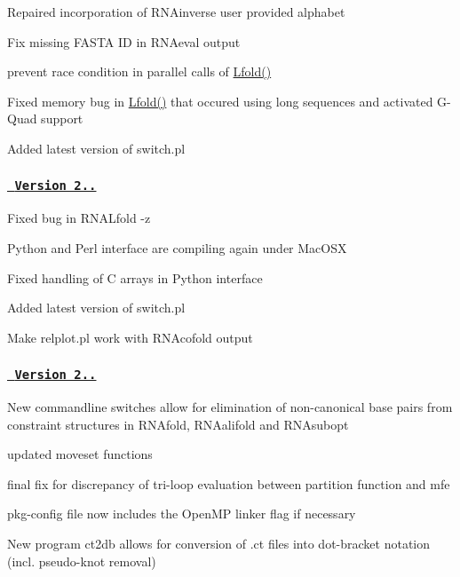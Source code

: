 \begin{DoxyItemize}
\item Repaired incorporation of R\+N\+Ainverse user provided alphabet
\item Fix missing F\+A\+S\+TA ID in R\+N\+Aeval output
\item prevent race condition in parallel calls of \mbox{\hyperlink{group__mfe__window__deprecated_gafdd1e11b5c7ad443b9f86b818e67bab4}{Lfold()}}
\item Fixed memory bug in \mbox{\hyperlink{group__mfe__window__deprecated_gafdd1e11b5c7ad443b9f86b818e67bab4}{Lfold()}} that occured using long sequences and activated G-\/\+Quad support
\item Added latest version of switch.\+pl
\end{DoxyItemize}

\subsubsection*{\href{https://github.com/ViennaRNA/ViennaRNA/compare/v2.1.6...v2.1.7}{\texttt{ Version 2..}}}


\begin{DoxyItemize}
\item Fixed bug in R\+N\+A\+Lfold -\/z
\item Python and Perl interface are compiling again under Mac\+O\+SX
\item Fixed handling of C arrays in Python interface
\item Added latest version of switch.\+pl
\item Make relplot.\+pl work with R\+N\+Acofold output
\end{DoxyItemize}

\subsubsection*{\href{https://github.com/ViennaRNA/ViennaRNA/compare/v2.1.5...v2.1.6}{\texttt{ Version 2..}}}


\begin{DoxyItemize}
\item New commandline switches allow for elimination of non-\/canonical base pairs from constraint structures in R\+N\+Afold, R\+N\+Aalifold and R\+N\+Asubopt
\item updated moveset functions
\item final fix for discrepancy of tri-\/loop evaluation between partition function and mfe
\item pkg-\/config file now includes the Open\+MP linker flag if necessary
\item New program ct2db allows for conversion of .ct files into dot-\/bracket notation (incl. pseudo-\/knot removal)
\end{DoxyItemize}

